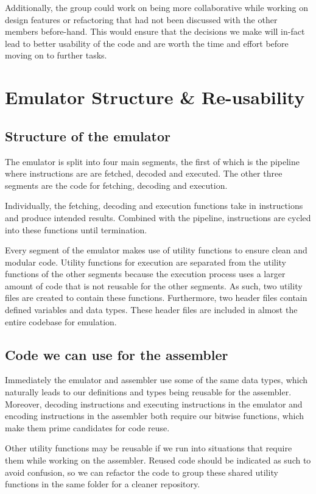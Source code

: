 \documentclass[a4paper]{article}
\begin{document}
Additionally, the group could work on being more collaborative while working on design features or refactoring that had not been discussed with the other members before-hand. This would ensure that the decisions we make will in-fact lead to better usability of the code and are worth the time and effort before moving on to further tasks.

\section{Emulator Structure \& Re-usability}
\subsection{Structure of the emulator}
The emulator is split into four main segments, the first of which is the pipeline where instructions are are fetched, decoded and executed. The other three segments are the code for fetching, decoding and execution.

Individually, the fetching, decoding and execution functions take in instructions and produce intended results. Combined with the pipeline, instructions are cycled into these functions until termination.

Every segment of the emulator makes use of utility functions to ensure clean and modular code. Utility functions for execution are separated from the utility functions of the other segments because the execution process uses a larger amount of code that is not reusable for the other segments. As such, two utility files are created to contain these functions. Furthermore, two header files contain defined variables and data types. These header files are included in almost the entire codebase for emulation.

\subsection{Code we can use for the assembler}
Immediately the emulator and assembler use some of the same data types, which naturally leads to our definitions and types being reusable for the assembler. Moreover, decoding instructions and executing instructions in the emulator and encoding instructions in the assembler both require our bitwise functions, which make them prime candidates for code reuse.

Other utility functions may be reusable if we run into situations that require them while working on the assembler. Reused code should be indicated as such to avoid confusion, so we can refactor the code to group these shared utility functions in the same folder for a cleaner repository.
\end{document}
